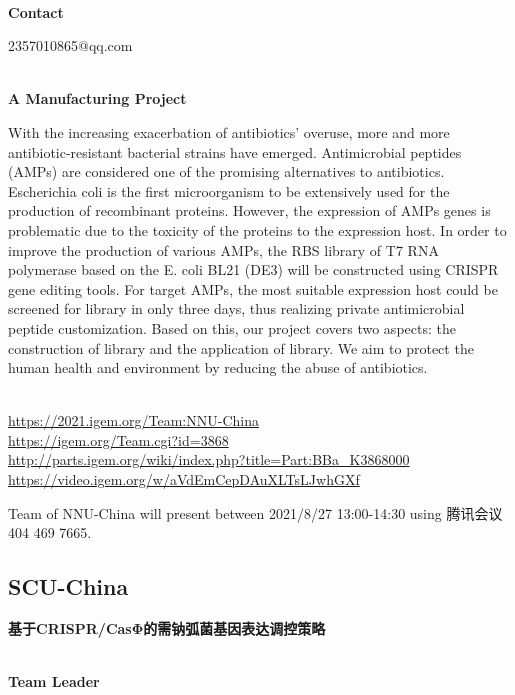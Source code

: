 \textbf{\\Contact}

  2357010865@qq.com


\textbf{\\A Manufacturing Project\\}\begin{spacing}{1.5}

With the increasing exacerbation of antibiotics’ overuse, more and more antibiotic-resistant bacterial strains have emerged. Antimicrobial peptides (AMPs) are considered one of the promising alternatives to antibiotics. Escherichia coli is the first microorganism to be extensively used for the production of recombinant proteins. However, the expression of AMPs genes is problematic due to the toxicity of the proteins to the expression host. In order to improve the production of various AMPs, the RBS library of T7 RNA polymerase based on the E. coli BL21 (DE3) will be constructed using CRISPR gene editing tools. For target AMPs, the most suitable expression host could be screened for library in only three days, thus realizing private antimicrobial peptide customization. Based on this, our project covers two aspects: the construction of library and the application of library. We aim to protect the human health and environment by reducing the abuse of antibiotics.\end{spacing}
\\

\url{https://2021.igem.org/Team:NNU-China }\\
\url{https://igem.org/Team.cgi?id=3868 }\\
\url{http://parts.igem.org/wiki/index.php?title=Part:BBa_K3868000 }\\
\url{https://video.igem.org/w/aVdEmCepDAuXLTsLJwhGXf }\\

\vfill{}









Team of NNU-China will present between 2021/8/27 13:00-14:30        using 腾讯会议 404 469 7665.
\newpage


\subsection{\textcolor{Blu}{ SCU-China } }
\vspace{5mm}
\begin{center}
\large{
  \textbf{ 基于CRISPR/CasΦ的需钠弧菌基因表达调控策略 }\\

}
\end{center}
\textbf{\\Team Leader}

